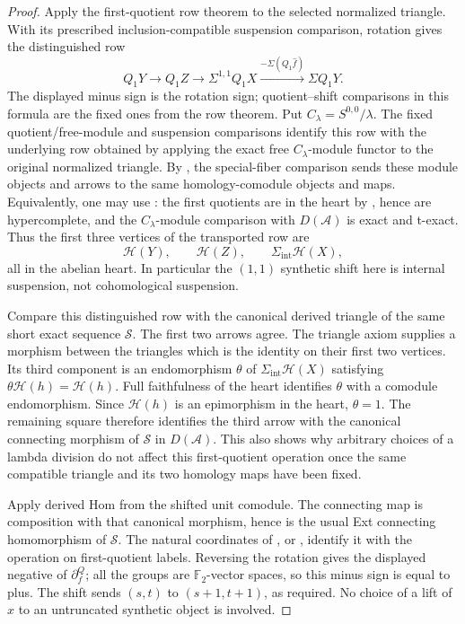 \begin{proof}
Apply the first-quotient row theorem to the selected normalized
triangle. With its prescribed inclusion-compatible suspension
comparison, rotation gives the distinguished row
\[
Q_1Y\longrightarrow Q_1Z\longrightarrow
\Sigma^{1,1}Q_1X\xrightarrow{-\Sigma(Q_1\widehat f)}
\Sigma Q_1Y.
\]
The displayed minus sign is the rotation sign; quotient--shift
comparisons in this formula are the fixed ones from the row theorem.
Put $C_\lambda=S^{0,0}/\lambda$. The fixed quotient/free-module and
suspension comparisons identify this row with the underlying row
obtained by applying the exact free $C_\lambda$-module functor to the
original normalized triangle. By \cite[Theorem 9.12(5)]{BHS}, the
special-fiber comparison sends these module objects and arrows to the
same homology-comodule objects and maps. Equivalently, one may use
\cite[Theorem 4.54]{Pst}: the first quotients are in the heart by
\cite[Lemma 4.29]{Pst}, hence are hypercomplete, and the $C_\lambda$-module
comparison with $D(\mathcal A)$ is exact and t-exact. Thus the first
three vertices of the transported row are
\[
\mathcal H(Y),\qquad\mathcal H(Z),\qquad
\Sigma_{\mathrm{int}}\mathcal H(X),
\]
all in the abelian heart. In particular the $(1,1)$ synthetic shift
here is internal suspension, not cohomological suspension.

Compare this distinguished row with the canonical derived triangle of
the same short exact sequence $\mathcal S$. The first two arrows agree.
The triangle axiom supplies a morphism between the triangles which is
the identity on their first two vertices. Its third component is an
endomorphism $\theta$ of $\Sigma_{\mathrm{int}}\mathcal H(X)$ satisfying
$\theta\mathcal H(h)=\mathcal H(h)$. Full faithfulness of the heart
identifies $\theta$ with a comodule endomorphism. Since
$\mathcal H(h)$ is an epimorphism in the heart, $\theta=1$.
The remaining square therefore identifies the third arrow with the
canonical connecting morphism of $\mathcal S$ in $D(\mathcal A)$.
This also shows why arbitrary choices of a lambda division do not
affect this first-quotient operation once the same compatible triangle
and its two homology maps have been fixed.

Apply derived Hom from the shifted unit comodule. The connecting map is
composition with that canonical morphism, hence is the usual Ext
connecting homomorphism of $\mathcal S$.
The natural coordinates of \cite[Corollary 9.13]{BHS}, or
\cite[Lemma 4.56]{Pst}, identify it with the operation on first-quotient
labels. Reversing the rotation gives the displayed negative of
$\partial_f^Q$; all the groups are $\mathbb F_2$-vector spaces, so this
minus sign is equal to plus. The shift sends $(s,t)$ to
$(s+1,t+1)$, as required. No choice of a lift of $x$ to an untruncated
synthetic object is involved.
\end{proof}

